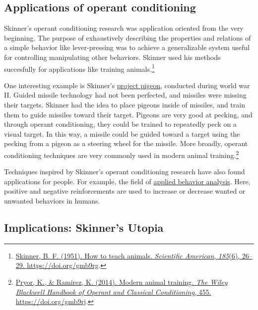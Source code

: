 \documentclass[
  oneside,
  12pt]{crumpbook}
\begin{document}
\hypertarget{applications-of-operant-conditioning}{%
\subsection{Applications of operant conditioning}\label{applications-of-operant-conditioning}}

Skinner's operant conditioning research was application oriented from the very beginning. The purpose of exhaustively describing the properties and relations of a simple behavior like lever-pressing was to achieve a generalizable system useful for controlling manipulating other behaviors. Skinner used his methods succesfully for applications like training animals.\footnote{\protect\hyperlink{ref-skinnerHowTeachAnimals1951}{Skinner, B. F. (1951). How to teach animals. \emph{Scientific American}, \emph{185}(6), 26--29. \url{https://doi.org/gmb9rg}}.}

One interesting example is Skinner's \href{https://www.bfskinner.org/project-pigeon/}{project pigeon}, conducted during world war II. Guided missile technology had not been perfected, and missiles were missing their targets. Skinner had the idea to place pigeons inside of missiles, and train them to guide missiles toward their target. Pigeons are very good at pecking, and through operant conditioning, they could be trained to repeatedly peck on a visual target. In this way, a missile could be guided toward a target using the pecking from a pigeon as a steering wheel for the missile. More broadly, operant conditioning techniques are very commonly used in modern animal training.\footnote{\protect\hyperlink{ref-pryorModernAnimalTraining2014}{Pryor, K., \& Ramirez, K. (2014). Modern animal training. \emph{The Wiley Blackwell Handbook of Operant and Classical Conditioning}, 455. \url{https://doi.org/gmb9rj}}.}

Techniques inspired by Skinner's operant conditioning research have also found applications for people. For example, the field of \href{https://en.wikipedia.org/wiki/Applied_behavior_analysis}{applied behavior analysis}. Here, positive and negative reinforcements are used to increase or decrease wanted or unwanted behaviors in humans.

\hypertarget{implications-skinners-utopia}{%
\subsection{Implications: Skinner's Utopia}\label{implications-skinners-utopia}}
\end{document}
